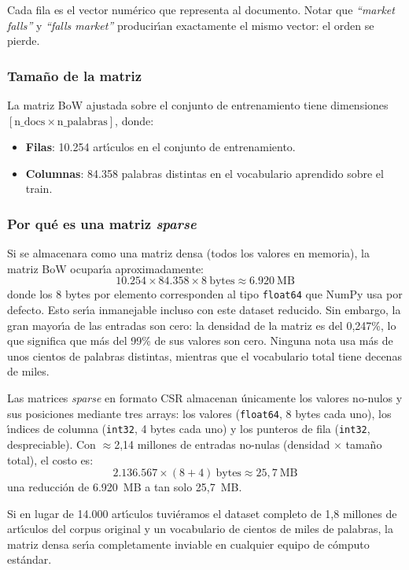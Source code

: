 \documentclass[11pt,a4paper]{article}
\begin{document}
Cada fila es el vector num\'{e}rico que representa al documento. Notar que \textit{``market falls''} y \textit{``falls market''} producir\'{\i}an exactamente el mismo vector: el orden se pierde.

\subsubsection*{Tama\~{n}o de la matriz}

La matriz BoW ajustada sobre el conjunto de entrenamiento tiene dimensiones $[\text{n\_docs} \times \text{n\_palabras}]$, donde:
\begin{itemize}
    \item \textbf{Filas}: 10.254 art\'{\i}culos en el conjunto de entrenamiento.
    \item \textbf{Columnas}: 84.358 palabras distintas en el vocabulario aprendido sobre el train.
\end{itemize}

\subsubsection*{Por qu\'{e} es una matriz \textit{sparse}}

Si se almacenara como una matriz densa (todos los valores en memoria), la matriz BoW ocupar\'{\i}a aproximadamente:
\[
10.254 \times 84.358 \times 8\ \text{bytes} \approx 6.920\ \text{MB}
\]
donde los 8 bytes por elemento corresponden al tipo \texttt{float64} que NumPy usa por defecto. Esto ser\'{\i}a inmanejable incluso con este dataset reducido. Sin embargo, la gran mayor\'{\i}a de las entradas son cero: la densidad de la matriz es del 0,247\%, lo que significa que m\'{a}s del 99\% de sus valores son cero. Ninguna nota usa m\'{a}s de unos cientos de palabras distintas, mientras que el vocabulario total tiene decenas de miles.

Las matrices \textit{sparse} en formato CSR almacenan \'{u}nicamente los valores no-nulos y sus posiciones mediante tres arrays: los valores (\texttt{float64}, 8 bytes cada uno), los \'{\i}ndices de columna (\texttt{int32}, 4 bytes cada uno) y los punteros de fila (\texttt{int32}, despreciable). Con $\approx$2,14 millones de entradas no-nulas (densidad $\times$ tama\~{n}o total), el costo es:
\[
2{.}136{.}567 \times (8 + 4)\ \text{bytes} \approx 25{,}7\ \text{MB}
\]
una reducci\'{o}n de 6.920~MB a tan solo 25,7~MB.

Si en lugar de 14.000 art\'{\i}culos tuvi\'{e}ramos el dataset completo de 1,8 millones de art\'{\i}culos del corpus original y un vocabulario de cientos de miles de palabras, la matriz densa ser\'{\i}a completamente inviable en cualquier equipo de c\'{o}mputo est\'{a}ndar.
\end{document}
